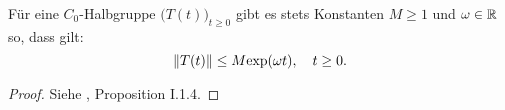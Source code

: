 


\begin{bem}\label{Relative Beschränktheit von Halbgruppen}
Für eine $C_0$-Halbgruppe $\big(T(t)\big)_{t\geq0}$ gibt es stets Konstanten $M\geq 1$ und $\omega\in \mathbb{R}$ so, dass gilt:
\begin{equation*}\label{Abschätzung}
\|T(t)\|\leq M\textnormal{exp}(\omega t),\quad t\geq0.
\end{equation*}
\end{bem}

\begin{proof}
Siehe \cite{engel_nagel_2006}, Proposition I.1.4.
\end{proof}






